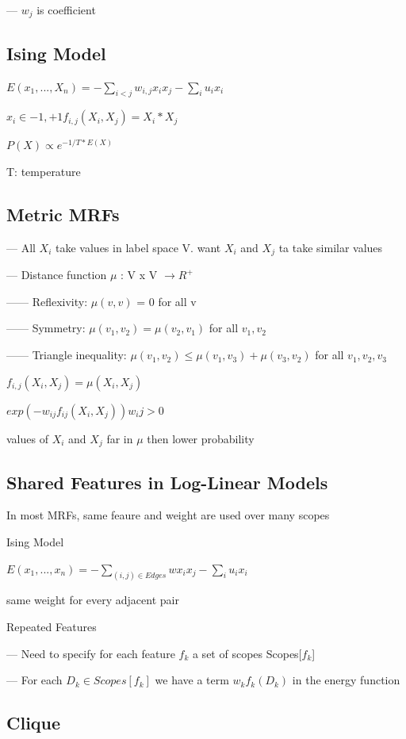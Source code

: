 \documentclass{book}
\begin{document}
--- $w_j$ is coefficient

\subsection{Ising Model}

$E(x_1,...,X_n) = - \sum_{i<j} w_{i,j}x_i x_j - \sum_i u_i x_i$

$x_i \in {-1,+1} f_{i,j}(X_i, X_j) = X_i * X_j $

$P(X) \propto e^{-1/T * E(X)} $

T: temperature 

\subsection{Metric MRFs}

--- All $X_i$ take values in label space V. want $X_i$ and $X_j$ ta take similar values

--- Distance function $\mu$ : V x V $ \rightarrow R^+$

------ Reflexivity: $\mu(v,v)$ = 0 for all v

------ Symmetry: $\mu(v_1,v_2) = \mu(v_2,v_1)$ for all $v_1, v_2$

------ Triangle inequality: $\mu(v_1,v_2) \leq \mu(v_1,v_3) + \mu(v_3,v_2)$ for all $v_1,v_2,v_3$

$f_{i,j}(X_i,X_j) = \mu(X_i,X_j) $

$exp(-w_{ij}f_{ij}(X_i,X_j)) w_ij > 0$

values of $X_i$ and $X_j$ far in $\mu$ then lower probability

\subsection{Shared Features in Log-Linear Models}
 In most MRFs, same feaure and weight are used over many scopes
 
 Ising Model
 
 $E(x_1,...,x_n) = - \sum_{(i,j) \in Edges} w x_i x_j - \sum_i u_i x_i$
 
 same weight for every adjacent pair
 
 Repeated Features
 
 --- Need to specify for each feature $f_k$ a set of scopes Scopes[$f_k$]
 
 --- For each $D_k \in Scopes[f_k]$ we have a term $w_kf_k(D_k)$ in the energy function
 

\subsection{Clique}
\end{document}
